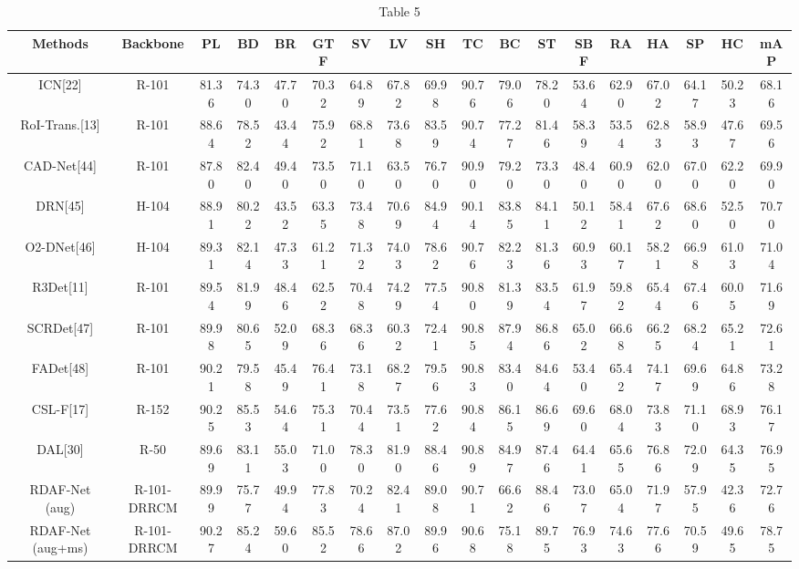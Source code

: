 \documentclass[journal]{IEEEtran}
\begin{document}
\begin{table}[t]
\centering
\begin{tabular}{c c c c c c c c c c c c c c c c c c}
\toprule
\textbf{Methods} & \textbf{Backbone} & \textbf{PL} & \textbf{BD} & \textbf{BR} & \textbf{GTF} & \textbf{SV} & \textbf{LV} & \textbf{SH} & \textbf{TC} & \textbf{BC} & \textbf{ST} & \textbf{SBF} & \textbf{RA} & \textbf{HA} & \textbf{SP} & \textbf{HC} & \textbf{mAP} \\
\midrule
ICN[22] & R-101 & 81.36 & 74.30 & 47.70 & 70.32 & 64.89 & 67.82 & 69.98 & 90.76 & 79.06 & 78.20 & 53.64 & 62.90 & 67.02 & 64.17 & 50.23 & 68.16 \\
RoI-Trans.[13] & R-101 & 88.64 & 78.52 & 43.44 & 75.92 & 68.81 & 73.68 & 83.59 & 90.74 & 77.27 & 81.46 & 58.39 & 53.54 & 62.83 & 58.93 & 47.67 & 69.56 \\
CAD-Net[44] & R-101 & 87.80 & 82.40 & 49.40 & 73.50 & 71.10 & 63.50 & 76.70 & 90.90 & 79.20 & 73.30 & 48.40 & 60.90 & 62.00 & 67.00 & 62.20 & 69.90 \\
DRN[45] & H-104 & 88.91 & 80.22 & 43.52 & 63.35 & 73.48 & 70.69 & 84.94 & 90.14 & 83.85 & 84.11 & 50.12 & 58.41 & 67.62 & 68.60 & 52.50 & 70.70 \\
O2-DNet[46] & H-104 & 89.31 & 82.14 & 47.33 & 61.21 & 71.32 & 74.03 & 78.62 & 90.76 & 82.23 & 81.36 & 60.93 & 60.17 & 58.21 & 66.98 & 61.03 & 71.04 \\
R3Det[11] & R-101 & 89.54 & 81.99 & 48.46 & 62.52 & 70.48 & 74.29 & 77.54 & 90.80 & 81.39 & 83.54 & 61.97 & 59.82 & 65.44 & 67.46 & 60.05 & 71.69 \\
SCRDet[47] & R-101 & 89.98 & 80.65 & 52.09 & 68.36 & 68.36 & 60.32 & 72.41 & 90.85 & 87.94 & 86.86 & 65.02 & 66.68 & 66.25 & 68.24 & 65.21 & 72.61 \\
FADet[48] & R-101 & 90.21 & 79.58 & 45.49 & 76.41 & 73.18 & 68.27 & 79.56 & 90.83 & 83.40 & 84.64 & 53.40 & 65.42 & 74.17 & 69.69 & 64.86 & 73.28 \\
CSL-F[17] & R-152 & 90.25 & 85.53 & 54.64 & 75.31 & 70.44 & 73.51 & 77.62 & 90.84 & 86.15 & 86.69 & 69.60 & 68.04 & 73.83 & 71.10 & 68.93 & 76.17 \\
DAL[30] & R-50 & 89.69 & 83.11 & 55.03 & 71.00 & 78.30 & 81.90 & 88.46 & 90.89 & 84.97 & 87.46 & 64.41 & 65.65 & 76.86 & 72.09 & 64.35 & 76.95 \\
RDAF-Net
(aug) & R-101-DRRCM & 89.99 & 75.77 & 49.94 & 77.83 & 70.24 & 82.41 & 89.08 & 90.71 & 66.62 & 88.46 & 73.07 & 65.04 & 71.97 & 57.95 & 42.36 & 72.76 \\
RDAF-Net
(aug+ms) & R-101-DRRCM & 90.27 & 85.24 & 59.60 & 85.52 & 78.66 & 87.02 & 89.96 & 90.68 & 75.18 & 89.75 & 76.93 & 74.63 & 77.66 & 70.59 & 49.65 & 78.75 \\
\bottomrule
\end{tabular}
\caption{Table 5}
\label{tab:tbl_5}
\end{table}
\end{document}
